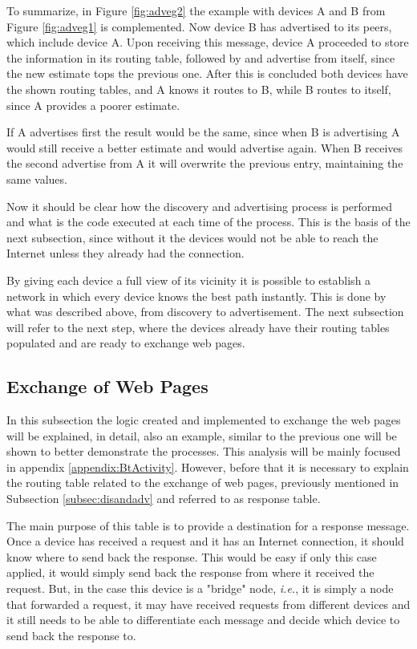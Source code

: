 To summarize, in Figure \ref{fig:adveg2} the example with devices A and B from Figure \ref{fig:adveg1} is complemented. Now device B has advertised to its peers, which include device A. Upon receiving this message, device A proceeded to store the information in its routing table, followed by and advertise from itself, since the new estimate tops the previous one. After this is concluded both devices have the shown routing tables, and A knows it routes to B, while B routes to itself, since A provides a poorer estimate.

If A advertises first the result would be the same, since when B is advertising A would still receive a better estimate and would advertise again. When B receives the second advertise from A it will overwrite the previous entry, maintaining the same values.

Now it should be clear how the discovery and advertising process is performed and what is the code executed at each time of the process. This is the basis of the next subsection, since without it the devices would not be able to reach the Internet unless they already had the connection.

By giving each device a full view of its vicinity it is possible to establish a network in which every device knows the best path instantly. This is done by what was described above, from discovery to advertisement. The next subsection will refer to the next step, where the devices already have their routing tables populated and are ready to exchange web pages. 

\subsection{Exchange of Web Pages}
\label{subsec:exch}

In this subsection the logic created and implemented to exchange the web pages will be explained, in detail, also an example, similar to the previous one will be shown to better demonstrate the processes. This analysis will be mainly focused in appendix \ref{appendix:BtActivity}. However, before that it is necessary to explain the routing table related to the exchange of web pages, previously mentioned in Subsection \ref{subsec:disandadv} and referred to as response table.

The main purpose of this table is to provide a destination for a response message. Once a device has received a request and it has an Internet connection, it should know where to send back the response. This would be easy if only this case applied, it would simply send back the response from where it received the request. But, in the case this device is a "bridge" node, \textit{i.e.}, it is simply a node that forwarded a request, it may have received requests from different devices and it still needs to be able to differentiate each message and decide which device to send back the response to.

